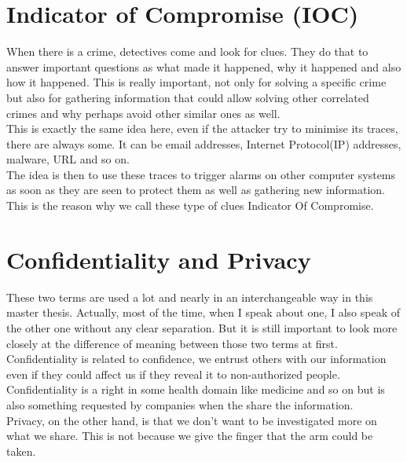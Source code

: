 \documentclass{eplmastersthesis}
\begin{document}
\section{Indicator of Compromise (IOC)}
When there is a crime, detectives come and look for clues. They do that to answer important questions as what made it happened, why it happened and also how it happened. This is really important, not only for solving a specific crime but also for gathering information that could allow solving other correlated crimes and why perhaps avoid other similar ones as well.\\
This is exactly the same idea here, even if the attacker try to minimise its traces, there are always some. It can be email addresses, Internet Protocol(IP) addresses, malware, URL and so on.\\
The idea is then to use these traces to trigger alarms on other computer systems as soon as they are seen to protect them as well as gathering new information. This is the reason why we call these type of clues Indicator Of Compromise.

\section{Confidentiality and Privacy}
These two terms are used a lot and nearly in an interchangeable way in this master thesis. Actually, most of the time, when I speak about one, I also speak of the other one without any clear separation. But it is still important to look more closely at the difference of meaning between those two terms at first.\\

Confidentiality is related to confidence, we entrust others with our information even if they could affect us if they reveal it to non-authorized people. Confidentiality is a right in some health domain like medicine and so on but is also something requested by companies when the share the information.\\

Privacy, on the other hand, is that we don't want to be investigated more on what we share. This is not because we give the finger that the arm could be taken.
\end{document}
